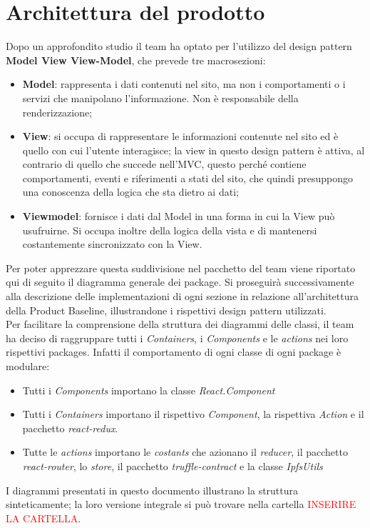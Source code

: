 \section{Architettura del prodotto}
Dopo un approfondito studio il team ha optato per l'utilizzo del design pattern \textbf{Model View View-Model}, che prevede tre macrosezioni:
	\begin{itemize}
		\item \textbf{Model}: rappresenta i dati contenuti nel sito, ma non i comportamenti o i servizi che manipolano l'informazione. Non è responsabile della renderizzazione;
		\item \textbf{View}: si occupa di rappresentare le informazioni contenute nel sito ed è quello con cui l'utente interagisce; la view in questo design pattern è attiva, al contrario di quello che succede nell'MVC, questo perché contiene comportamenti, eventi e riferimenti a stati del sito, che quindi presuppongo una conoscenza della logica che sta dietro ai dati;
		\item \textbf{Viewmodel}: fornisce i dati dal Model in una forma in cui la View può usufruirne. Si occupa inoltre della logica della vista e di mantenersi costantemente sincronizzato con la View.
	\end{itemize}
Per poter apprezzare questa suddivisione nel pacchetto del team viene riportato qui di seguito il diagramma generale dei package. Si proseguirà successivamente alla descrizione delle implementazioni di ogni sezione in relazione all'architettura della Product Baseline, illustrandone i rispettivi design pattern utilizzati.
\\Per facilitare la comprensione della struttura dei diagrammi delle classi, il team ha deciso di raggruppare tutti i \emph{Containers}, i \emph{Components} e le \emph{actions} nei loro rispettivi packages. Infatti il comportamento di ogni classe di ogni package è modulare:
	\begin{itemize}
		\item Tutti i \emph{Components} importano la classe \emph{React.Component}
		\item Tutti i \emph{Containers} importano il rispettivo \emph{Component}, la rispettiva \emph{Action} e il pacchetto \emph{react-redux}.
		\item Tutte le \emph{actions} importano le \emph{costants} che azionano il \emph{reducer}, il pacchetto \emph{react-router}, lo \emph{store}, il pacchetto \emph{truffle-contract} e la classe \emph{IpfsUtils}
	\end{itemize}
I diagrammi presentati in questo documento illustrano la struttura sinteticamente; la loro versione integrale si può trovare nella cartella {\textcolor{red}{INSERIRE LA CARTELLA}}.

